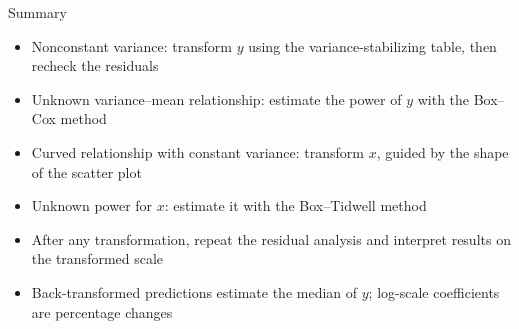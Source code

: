 \begin{frame}{Summary}
\begin{itemize}
    \item Nonconstant variance: transform $y$ using the variance-stabilizing table, then recheck the residuals
    \item Unknown variance--mean relationship: estimate the power of $y$ with the Box--Cox method
    \item Curved relationship with constant variance: transform $x$, guided by the shape of the scatter plot
    \item Unknown power for $x$: estimate it with the Box--Tidwell method
    \item After any transformation, repeat the residual analysis and interpret results on the transformed scale
    \item Back-transformed predictions estimate the median of $y$; log-scale coefficients are percentage changes
\end{itemize}
\end{frame}